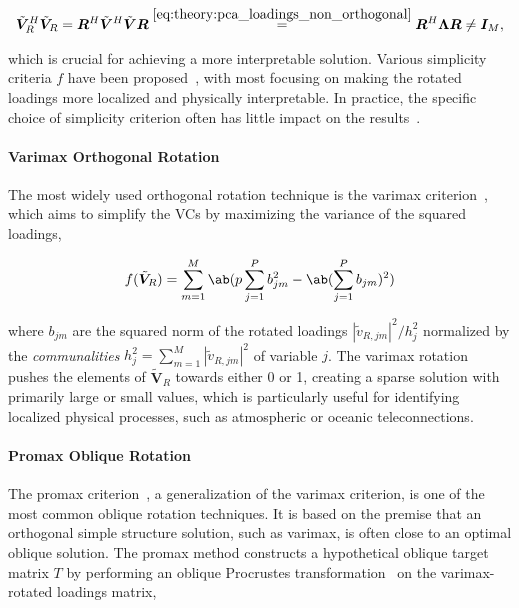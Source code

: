 \begin{align}
    \tilde{\bm{V}}_R^H \tilde{\bm{V}}_R = \bm{R}^H \tilde{\bm{V}}^H  \tilde{\bm{V}} \bm{R} \overset{\eqref{eq:theory:pca_loadings_non_orthogonal}}{=} \bm{R}^H \bm{\Lambda} \bm{R} \neq \bm{I}_M,
\end{align}

which is crucial for achieving a more interpretable solution. Various simplicity criteria $f$ have been proposed~\cite[see e.g.][]{richman_rotation_1986}, with most focusing on making the rotated loadings more localized and physically interpretable. In practice, the specific choice of simplicity criterion often has little impact on the results~\cite{richman_rotation_1986}.

\paragraph{Varimax Orthogonal Rotation} The most widely used orthogonal rotation technique is the varimax criterion~\cite{kaiser_varimax_1958}, which aims to simplify the VCs by maximizing the variance of the squared loadings,

\begin{align}
    f(\tilde{\bm{V}}_R) = \sum_{m=1}^{M} \ab(p \sum_{j=1}^{P} b_{jm}^2 - \ab(\sum_{j=1}^{P} b_{jm})^2 )
\end{align}

where $b_{jm}$ are the squared norm of the rotated loadings $|\tilde{v}_{R, jm}|^2 / h_j^2$ normalized by the \textit{communalities} $h_j^2 = \sum_{m=1}^{M}|\tilde{v}_{R, jm}|^2$ of variable $j$. The varimax rotation pushes the elements of $\tilde{\bm{V}}_R$ towards either 0 or 1, creating a sparse solution with primarily large or small values, which is particularly useful for identifying localized physical processes, such as atmospheric or oceanic teleconnections.

\paragraph{Promax Oblique Rotation} The promax criterion~\cite{hendrickson_promax_1964}, a generalization of the varimax criterion, is one of the most common oblique rotation techniques. It is based on the premise that an orthogonal simple structure solution, such as varimax, is often close to an optimal oblique solution. The promax method constructs a hypothetical oblique target matrix $T$ by performing an oblique Procrustes transformation~\cite{hurley_procrustes_1962} on the varimax-rotated loadings matrix,

